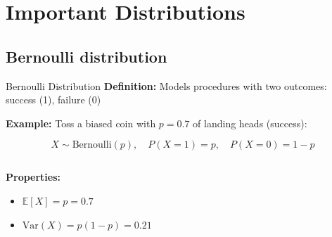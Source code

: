 \documentclass{beamer}
\begin{document}
\section{Important Distributions}

\subsection{Bernoulli distribution}

\begin{frame}{Bernoulli Distribution}
  \textbf{Definition:} Models procedures with two outcomes: success (1), failure (0)

  \textbf{Example:} Toss a biased coin with \(p=0.7\) of landing heads (success):

  \[
    X \sim \text{Bernoulli}(p), \quad P(X=1) = p, \quad P(X=0) = 1-p
  \]

  \begin{columns}[T] %
    \begin{column}{0.48\textwidth}
      \textbf{Properties:}
      \begin{itemize}
        \item \( \mathbb{E}[X] = p = 0.7 \)
        \item \( \mathrm{Var}(X) = p(1-p) = 0.21 \)
      \end{itemize}
    \end{column}

    \begin{column}{0.48\textwidth}
    \end{column}
  \end{columns}
\end{frame}
\end{document}
